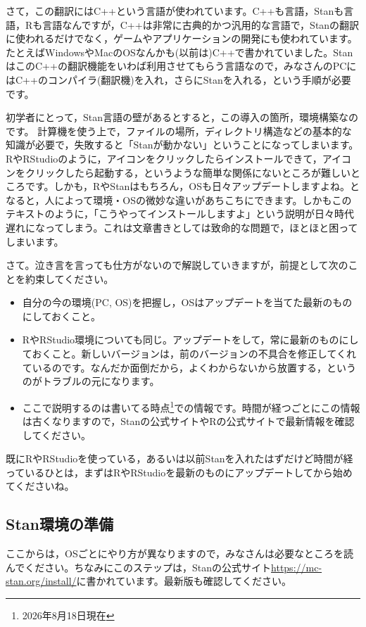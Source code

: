 \documentclass{ltjbook}
\begin{document}
さて，この翻訳にはC++という言語が使われています。C++も言語，Stanも言語，Rも言語なんですが，C++は非常に古典的かつ汎用的な言語で，Stanの翻訳に使われるだけでなく，ゲームやアプリケーションの開発にも使われています。たとえばWindowsやMacのOSなんかも(以前は)C++で書かれていました。StanはこのC++の翻訳機能をいわば利用させてもらう言語なので，みなさんのPCにはC++のコンパイラ(翻訳機)を入れ，さらにStanを入れる，という手順が必要です。

初学者にとって，Stan言語の壁があるとすると，この導入の箇所，環境構築なのです。
計算機を使う上で，ファイルの場所，ディレクトリ構造などの基本的な知識が必要で，失敗すると「Stanが動かない」ということになってしまいます。RやRStudioのように，アイコンをクリックしたらインストールできて，アイコンをクリックしたら起動する，というような簡単な関係にないところが難しいところです。しかも，RやStanはもちろん，OSも日々アップデートしますよね。となると，人によって環境・OSの微妙な違いがあちこちにできます。しかもこのテキストのように，「こうやってインストールしますよ」という説明が日々時代遅れになってしまう。これは文章書きとしては致命的な問題で，ほとほと困ってしまいます。


さて。泣き言を言っても仕方がないので解説していきますが，前提として次のことを約束してください。
\begin{itemize}
    \item 自分の今の環境(PC, OS)を把握し，OSはアップデートを当てた最新のものにしておくこと。
    \item RやRStudio環境についても同じ。アップデートをして，常に最新のものにしておくこと。新しいバージョンは，前のバージョンの不具合を修正してくれているのです。なんだか面倒だから，よくわからないから放置する，というのがトラブルの元になります。
    \item ここで説明するのは書いてる時点\footnote{2026年8月18日現在}での情報です。時間が経つごとにこの情報は古くなりますので，Stanの公式サイトやRの公式サイトで最新情報を確認してください。
\end{itemize}

既にRやRStudioを使っている，あるいは以前Stanを入れたはずだけど時間が経っているひとは，まずはRやRStudioを最新のものにアップデートしてから始めてくださいね。

\subsection{Stan環境の準備}
ここからは，OSごとにやり方が異なりますので，みなさんは必要なところを読んでください。ちなみにこのステップは，Stanの公式サイト\url{https://mc-stan.org/install/}に書かれています。最新版も確認してください。
\end{document}
